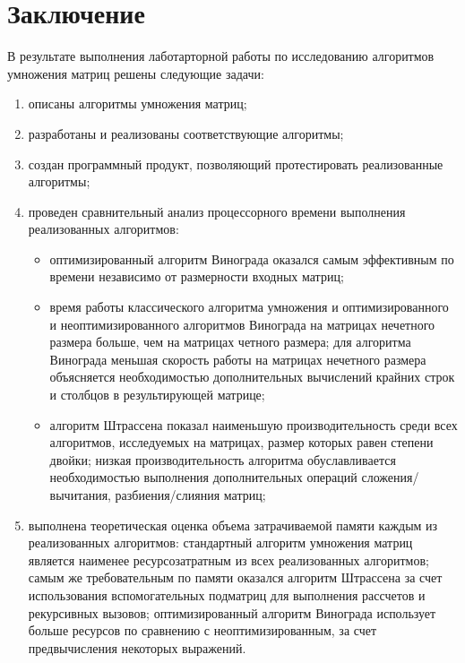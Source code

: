 \chapter*{Заключение}

В результате выполнения лаботарторной работы по исследованию алгоритмов умножения матриц решены следующие задачи:
\begin{enumerate}
    \item описаны алгоритмы умножения матриц;
    \item разработаны и реализованы соответствующие алгоритмы;
    \item создан программный продукт, позволяющий протестировать реализованные алгоритмы;
    \item проведен сравнительный анализ процессорного времени выполнения реализованных алгоритмов:
    \begin{itemize}
        \item оптимизированный алгоритм Винограда оказался самым эффективным по времени независимо от размерности входных матриц;
        \item время работы классического алгоритма умножения и оптимизированного и неоптимизированного алгоритмов Винограда на матрицах нечетного размера больше, чем на матрицах четного размера;
        для алгоритма Винограда меньшая скорость работы на матрицах нечетного размера объясняется необходимостью дополнительных вычислений крайних строк и столбцов в результирующей матрице;
        \item алгоритм Штрассена показал наименьшую производительность среди всех алгоритмов, исследуемых на матрицах, размер которых равен степени двойки;
        низкая производительность алгоритма обуславливается необходимостью выполнения дополнительных операций сложения/вычитания, разбиения/слияния матриц;
    \end{itemize}
    \item выполнена теоретическая оценка объема затрачиваемой памяти каждым из реализованных алгоритмов: стандартный алгоритм умножения матриц является наименее ресурсозатратным из всех реализованных алгоритмов;
    самым же требовательным по памяти оказался алгоритм Штрассена за счет использования вспомогательных подматриц для выполнения рассчетов и рекурсивных вызовов;
    оптимизированный алгоритм Винограда использует больше ресурсов по сравнению с неоптимизированным, за счет предвычисления некоторых выражений.
\end{enumerate}